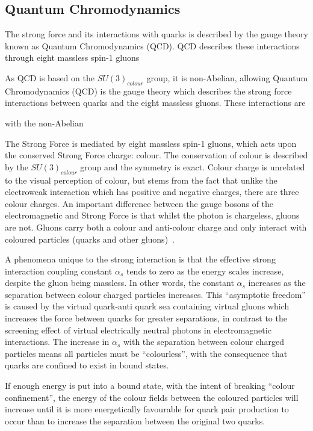 \subsection{Quantum Chromodynamics}\label{subsec:QED}
The strong force and its interactions with quarks is described by the gauge theory known as Quantum Chromodynamics (QCD).
QCD describes these interactions through eight massless spin-$1$ gluons 


As QCD is based on the $SU(3)_{colour}$ group, it is non-Abelian, allowing
Quantum Chromodynamics (QCD) is the gauge theory which describes the strong force interactions between quarks and the eight massless gluons.
These interactions are 

 with the non-Abelian 

The Strong Force is mediated by eight massless spin-1 gluons, which acts upon the conserved Strong Force charge: colour\cite{ElectroweakStrong}. 
The conservation of colour is described by the $SU(3)_{colour}$ group and the symmetry is exact. 
Colour charge is unrelated to the visual perception of colour, but stems from the fact that unlike the electroweak interaction which has positive and negative charges, there are three colour charges. 
An important difference between the gauge bosons of the electromagnetic and Strong Force is that whilst the photon is chargeless, gluons are not. 
Gluons carry both a colour and anti-colour charge and only interact with coloured particles (quarks and other gluons)~\cite{ElectroweakStrong}. 


A phenomena unique to the strong interaction is that the effective strong interaction coupling constant $\alpha_{s}$ tends to zero as the energy scales increase, despite the gluon being massless. 
In other words, the constant $\alpha_{s}$ increases as the separation between colour charged particles increases. 
This ``asymptotic freedom'' is caused by the virtual quark-anti quark sea containing virtual gluons which increases the force between quarks for greater separations, in contrast to the screening effect of virtual electrically neutral photons in electromagnetic interactions. 
The increase in $\alpha_{s}$ with the separation between colour charged particles means all particles must be ``colourless'', with the consequence that quarks are confined to exist in bound states\cite{ElectroweakStrong}. 




If enough energy is put into a bound state, with the intent of breaking ``colour confinement'', the energy of the colour fields between the coloured particles will increase until it is more energetically favourable for quark pair production to occur than to increase the separation between the original two quarks\cite{Griffiths}. 


